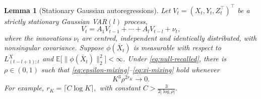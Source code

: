 \documentclass[12pt]{article}
\def\E{\mathbb{E}}
\newtheorem{lemma}[theorem]{Lemma}
\numberwithin{equation}{section}
\begin{document}
\begin{lemma}[Stationary Gaussian autoregressions]
\label{lem:gaussian-ar-short-memory}
Let $V_t=(X_t,Y_t,Z_t^\top)^\top$ be a strictly stationary
Gaussian VAR$(l)$ process,
\begin{equation}
 V_t=A_1V_{t-1}+\cdots+A_lV_{t-l}+\nu_t,
\end{equation}
where the innovations $\nu_t$ are centred, independent and identically distributed,
with nonsingular covariance. Suppose $\phi(\bar X_t)$ is measurable with respect
to $L^X_{(t-l+1):t}$ and $\E\big[\|\phi(\bar X_t)\|_2^2\big]<\infty$.
Under \eqref{eq:null-recalled}, there is $\rho\in(0,1)$ such that
\eqref{eq:epsilon-mixing}--\eqref{eq:xi-mixing} hold whenever
\begin{equation}\label{eq:gap-rate}
 K^3\rho^{2r_K}\rightarrow0.
\end{equation}
For example, $r_K=\lceil C\log K\rceil,$ with constant $C>\frac{3}{2|\log\rho|}.$
\end{lemma}
\end{document}

